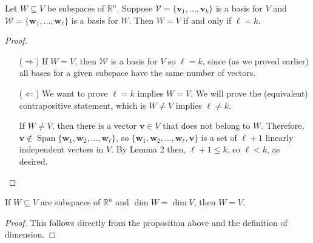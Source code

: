 \documentclass{article}
\newcommand{\R}{\ensuremath{\mathbb{R}}}
\newcommand{\Span}{\ensuremath{\operatorname{Span}}}
\newcommand{\sV}{\ensuremath{\mathcal{V}}}
\newcommand{\sW}{\ensuremath{\mathcal{W}}}
\newcommand{\vw}{\ensuremath{\mathbf{w}}}
\newcommand{\vv}{\ensuremath{\mathbf{v}}}
\begin{document}
Let $W \subseteq V$ be subspaces of $\R^n$.
Suppose $\sV = \{\mathbf{v}_1,\dots, \mathbf{v}_k\}$ is a basis for
$V$ and $\sW = \{\mathbf{w}_1,\dots, \mathbf{w}_\ell\}$ is a basis for $W$.
Then $W = V$ if and only if $\ell = k$.

\begin{proof}\
  \begin{itemize}
  \item[($\Rightarrow$)]
  If $W = V$, then $\sW$ is a basis for $V$ so $\ell = k$, since (as we proved
  earlier) all bases for a given subspace have the same number of vectors.

  \item[($\Leftarrow$)] We want to prove $\ell=k$ implies $W = V$.
  We will prove the (equivalent) contrapositive statement, which is
  $W \neq V$ implies $\ell\neq k$.


  If $W \neq V$, then there is a vector $\vv \in V$ that does not belong to $W$.
  Therefore, $\vv \notin \Span \{\vw_1, \vw_2, \dots, \vw_\ell\}$, so
  $\{\vw_1, \vw_2, \dots, \vw_\ell, \vv\}$ is a set of $\ell + 1$ linearly independent
  vectors in $V$.  By Lemma 2 then, $\ell + 1 \leq k$, so $\ell < k$, as desired.
  
  \end{itemize}
\end{proof}

 If $W \subseteq V$ are subspaces of $\R^n$ and $\dim W = \dim V$, then $W = V$.

\begin{proof}
  This follows directly from the proposition above and the definition of dimension.
\end{proof}
\end{document}
